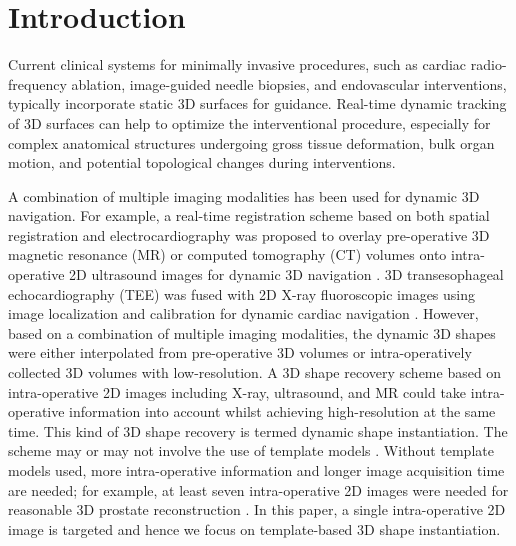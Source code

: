 \documentclass[review]{elsarticle}
\begin{document}
\section{Introduction}
Current clinical systems for minimally invasive procedures, such as cardiac radio-frequency ablation, image-guided needle biopsies, and endovascular interventions, typically incorporate static 3D surfaces for guidance. Real-time dynamic tracking of 3D surfaces can help to optimize the interventional procedure, especially for complex anatomical structures undergoing gross tissue deformation, bulk organ motion, and potential topological changes during interventions.

A combination of multiple imaging modalities has been used for dynamic 3D navigation. For example, a real-time registration scheme based on both spatial registration and electrocardiography was proposed to overlay pre-operative 3D magnetic resonance (MR) or computed tomography (CT) volumes onto intra-operative 2D ultrasound images for dynamic 3D navigation \citep{huang2009dynamic}. 3D transesophageal echocardiography (TEE) was fused with 2D X-ray fluoroscopic images using image localization and calibration for dynamic cardiac navigation \citep{gao2012registration}. However, based on a combination of multiple imaging modalities, the dynamic 3D shapes were either interpolated from pre-operative 3D volumes or intra-operatively collected 3D volumes with low-resolution. A 3D shape recovery scheme based on intra-operative 2D images including X-ray, ultrasound, and MR could take intra-operative information into account whilst achieving high-resolution at the same time. This kind of 3D shape recovery is termed dynamic shape instantiation. The scheme may or may not involve the use of template models \citep{filippi2008analysis}. Without template models used, more intra-operative information and longer image acquisition time are needed; for example, at least seven intra-operative 2D images were needed for reasonable 3D prostate reconstruction \citep{cool20063d}. In this paper, a single intra-operative 2D image is targeted and hence we focus on template-based 3D shape instantiation.
\end{document}
